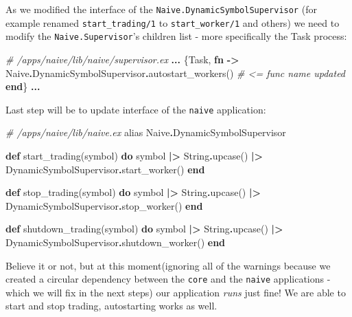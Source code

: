 \documentclass[
  oneside]{book}
\newenvironment{Shaded}{\begin{snugshade}}{\end{snugshade}}
\newcommand{\CommentTok}[1]{\textcolor[rgb]{0.56,0.35,0.01}{\textit{#1}}}
\newcommand{\ConstantTok}[1]{\textcolor[rgb]{0.00,0.00,0.00}{#1}}
\newcommand{\ImportTok}[1]{#1}
\newcommand{\KeywordTok}[1]{\textcolor[rgb]{0.13,0.29,0.53}{\textbf{#1}}}
\newcommand{\NormalTok}[1]{#1}
\newcommand{\OperatorTok}[1]{\textcolor[rgb]{0.81,0.36,0.00}{\textbf{#1}}}
\begin{document}
As we modified the interface of the \texttt{Naive.DynamicSymbolSupervisor} (for example renamed \texttt{start\_trading/1} to \texttt{start\_worker/1} and others) we need to modify the \texttt{Naive.Supervisor}'s children list - more specifically the Task process:

\begin{Shaded}
\begin{Highlighting}[]
\CommentTok{\# /apps/naive/lib/naive/supervisor.ex}
      \OperatorTok{...}
\NormalTok{      \{}\ConstantTok{Task}\NormalTok{,}
       \KeywordTok{fn} \OperatorTok{{-}\textgreater{}}
         \ConstantTok{Naive}\OperatorTok{.}\ConstantTok{DynamicSymbolSupervisor}\OperatorTok{.}\NormalTok{autostart\_workers() }\CommentTok{\# \textless{}= func name updated}
       \KeywordTok{end}\NormalTok{\}}
       \OperatorTok{...}
\end{Highlighting}
\end{Shaded}

Last step will be to update interface of the \texttt{naive} application:

\begin{Shaded}
\begin{Highlighting}[]
\CommentTok{\# /apps/naive/lib/naive.ex}
  \ImportTok{alias} \ConstantTok{Naive}\OperatorTok{.}\ConstantTok{DynamicSymbolSupervisor}

  \KeywordTok{def}\NormalTok{ start\_trading(symbol) }\KeywordTok{do}
\NormalTok{    symbol}
    \OperatorTok{|\textgreater{}} \ConstantTok{String}\OperatorTok{.}\NormalTok{upcase()}
    \OperatorTok{|\textgreater{}} \ConstantTok{DynamicSymbolSupervisor}\OperatorTok{.}\NormalTok{start\_worker()}
  \KeywordTok{end}

  \KeywordTok{def}\NormalTok{ stop\_trading(symbol) }\KeywordTok{do}
\NormalTok{    symbol}
    \OperatorTok{|\textgreater{}} \ConstantTok{String}\OperatorTok{.}\NormalTok{upcase()}
    \OperatorTok{|\textgreater{}} \ConstantTok{DynamicSymbolSupervisor}\OperatorTok{.}\NormalTok{stop\_worker()}
  \KeywordTok{end}

  \KeywordTok{def}\NormalTok{ shutdown\_trading(symbol) }\KeywordTok{do}
\NormalTok{    symbol}
    \OperatorTok{|\textgreater{}} \ConstantTok{String}\OperatorTok{.}\NormalTok{upcase()}
    \OperatorTok{|\textgreater{}} \ConstantTok{DynamicSymbolSupervisor}\OperatorTok{.}\NormalTok{shutdown\_worker()}
  \KeywordTok{end}
\end{Highlighting}
\end{Shaded}

Believe it or not, but at this moment(ignoring all of the warnings because we created a circular dependency between the \texttt{core} and the \texttt{naive} applications - which we will fix in the next steps) our application \emph{runs} just fine! We are able to start and stop trading, autostarting works as well.
\end{document}
